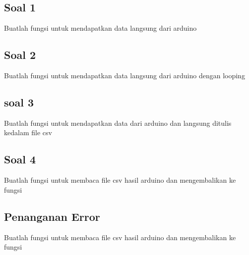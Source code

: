 \subsection{Soal 1}
Buatlah fungsi untuk mendapatkan data langsung dari arduino


\subsection{Soal 2}
Buatlah fungsi untuk mendapatkan data langsung dari arduino dengan looping


\subsection{soal 3}
Buatlah fungsi untuk mendapatkan data dari arduino dan langsung ditulis kedalam file csv


\subsection{Soal 4}
Buatlah fungsi untuk membaca file csv hasil arduino dan mengembalikan ke fungsi


\subsection{Penanganan Error}
Buatlah fungsi untuk membaca file csv hasil arduino dan mengembalikan ke fungsi


